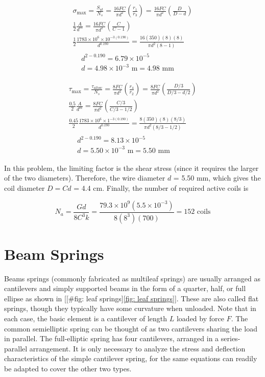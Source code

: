 \documentclass[a4paper,openany,12pt]{book}
\begin{document}
{{$$\begin{gathered}
  \sigma_{\max} = \frac{S_{ut}}{N_s} = \frac{16FC}{\pi d^2}\left( \frac{r_1}{r_3} \right) = \frac{16FC}{\pi d^2}\left( \frac{D}{D - d} \right) \\
  \frac{1}{2}\frac{A}{d^m} = \frac{16FC}{\pi d^2}\left( \frac{C}{C - 1} \right) \\ 
  \frac{1}{2}\frac{1783 \times 10^6 \times 10^{-3(0.190)}}{d^{0.190}} = \frac{16(350)(8)(8)}{\pi d^2(8 - 1)} \\
  \begin{aligned}
  &d^{2 - 0.190} = 6.79 \times 10^{-5} \\ 
  &d = 4.98 \times 10^{-3}\text{ m} = 4.98\text{ mm}
  \end{aligned}\end{gathered}$$

$$\begin{gathered}
  \tau_{\max} = \frac{\tau_{allow}}{N_s} = \frac{8FC}{\pi d^2}\left( \frac{r_4}{r_2} \right) = \frac{8FC}{\pi d^2}\left( \frac{D/3}{D/3 - d/2} \right) \\ 
  \frac{0.5}{2}\frac{A}{d^m} = \frac{8FC}{\pi d^2}\left( \frac{C/3}{C/3 - 1/2} \right) \\ 
  \frac{0.45}{2}\frac{1783 \times 10^6 \times 1^{-3(0.190)}}{d^{0.190}} = \frac{8(350)(8)(8/3)}{\pi d^2(8/3 - 1/2)} \\
  \begin{aligned}
  &d^{2 - 0.190} = 8.13 \times 10^{-5} \\ 
  &d = 5.50 \times 10^{-3}\text{ m} = 5.50 \text{ mm}
  \end{aligned}\end{gathered}$$

In this problem, the limiting factor is the shear stress (since it
requires the larger of the two diameters). Therefore, the wire diameter
\(d\) = 5.50 mm, which gives the coil diameter \(D = Cd\) = 4.4 cm. Finally,
the number of required active coils is

$$N_a = \frac{Gd}{8C^3k} = \frac{79.3 \times 10^9(5.5 \times 10^{-3})}{8(8^3)(700)} = 152\text{ coils}$$

\section{Beam Springs}
\label{beam-springs}
Beams springs (commonly fabricated as multileaf springs) are usually
arranged as cantilevers and simply supported beams in the form of a
quarter, half, or full ellipse as shown in
[[\#fig: leaf springs]\ref{fig: leaf springs}]. These are also called flat
springs, though they typically have some curvature when unloaded. Note
that in each case, the basic element is a cantilever of length \(L\)
loaded by force \(F\). The common semielliptic spring can be thought of as
two cantilevers sharing the load in parallel. The full-elliptic spring
has four cantilevers, arranged in a series-parallel arrangement. It is
only necessary to analyze the stress and deflection characteristics of
the simple cantilever spring, for the same equations can readily be
adapted to cover the other two types.

}}
\end{document}
